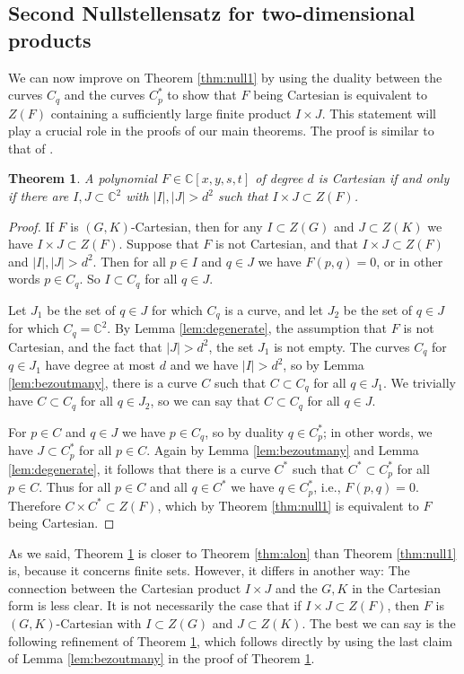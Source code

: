 \documentclass{daj}
\newtheorem{theorem}{Theorem}[section]
\theoremstyle{definition}
\newcommand{\C}{\mathbb C}
\begin{document}
\subsection{Second Nullstellensatz for two-dimensional products}

We can now improve on Theorem \ref{thm:null1} by using the duality between the curves $C_q$ and the curves $C_p^*$ to show that $F$ being Cartesian is equivalent to $Z(F)$ containing a sufficiently large finite product $I\times J$.
This statement will play a crucial role in the proofs of our main theorems.
The proof is similar to that of \cite[Lemma 3.11]{RSZ}.


\begin{theorem}\label{thm:null2}
A polynomial $F\in \C[x,y,s,t]$ of degree $d$
is Cartesian if and only if there are $I,J\subset \C^2$ with $|I|,|J|>d^2$ such that $I\times J\subset Z(F)$.
\end{theorem}
\begin{proof}
If $F$ is $(G,K)$-Cartesian, then for any $I\subset Z(G)$ and $J\subset Z(K)$ we have $I\times J\subset Z(F)$.
Suppose that $F$ is not Cartesian, and that $I\times J\subset Z(F)$ and $|I|,|J|>d^2$.
Then for all $p\in I$ and $q\in J$ we have $F(p,q)=0$, or in other words $p\in C_q$.
So $I\subset C_q$ for all $q\in J$.

Let $J_1$ be the set of $q\in J$ for which $C_q$ is a curve, and let $J_2$ be the set of $q\in J$ for which $C_q = \C^2$.
By Lemma \ref{lem:degenerate}, the assumption that $F$ is not Cartesian, and the fact that $|J|>d^2$, the set $J_1$ is not empty.
The curves $C_q$ for $q\in J_1$ have degree at most $d$ and we have $|I|>d^2$, so by Lemma \ref{lem:bezoutmany}, there is a curve $C$ such that $C\subset C_q$ for all $q\in J_1$.
We trivially have $C\subset C_q$ for all $q\in J_2$, so we can say that $C\subset C_q$ for all $q\in J$.

For $p\in C$ and $q\in J$ we have $p\in C_q$, so by duality $q\in C^*_p$; in other words, we have $J\subset C^*_p$ for all $p\in C$.
Again by Lemma \ref{lem:bezoutmany} and Lemma \ref{lem:degenerate},
it follows that there is a curve $C^*$ such that $C^*\subset C^*_p$ for all $p\in C$.
Thus for all $p\in C$ and all $q\in C^*$ we have $q\in C_p^*$, i.e., $F(p,q)=0$.
Therefore $C\times C^*\subset Z(F)$, which by Theorem \ref{thm:null1} is equivalent to $F$ being Cartesian.
\end{proof}


As we said, Theorem \ref{thm:null2} is closer to Theorem \ref{thm:alon} than Theorem \ref{thm:null1} is, because it concerns finite sets.
However, it differs in another way: The connection between the Cartesian product $I\times J$ and the $G,K$ in the Cartesian form is less clear.
It is not necessarily the case that if $I\times J\subset Z(F)$, then $F$ is $(G,K)$-Cartesian with $I\subset Z(G)$ and $J\subset Z(K)$.
The best we can say is the following refinement of Theorem \ref{thm:null2}, which follows directly by using the last claim of Lemma \ref{lem:bezoutmany} in the proof of Theorem \ref{thm:null2}.
\end{document}
